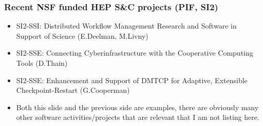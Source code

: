\begin{frame}
\frametitle{Recent NSF funded HEP S\&C projects (PIF, SI2)}
\begin{itemize}
\item SI2-SSI: Distributed Workflow Management Research and Software in Support of Science (E.Deelman, M.Livny)
\item SI2-SSE: Connecting Cyberinfrastructure with the Cooperative Computing Tools (D.Thain)
\item SI2-SSE: Enhancement and Support of DMTCP for Adaptive, Extensible Checkpoint-Restart (G.Cooperman)
\item Both this slide and the previous side are examples, there are obviously many other software activities/projects that are relevant that I am not listing here.
\end{itemize}
\end{frame}
